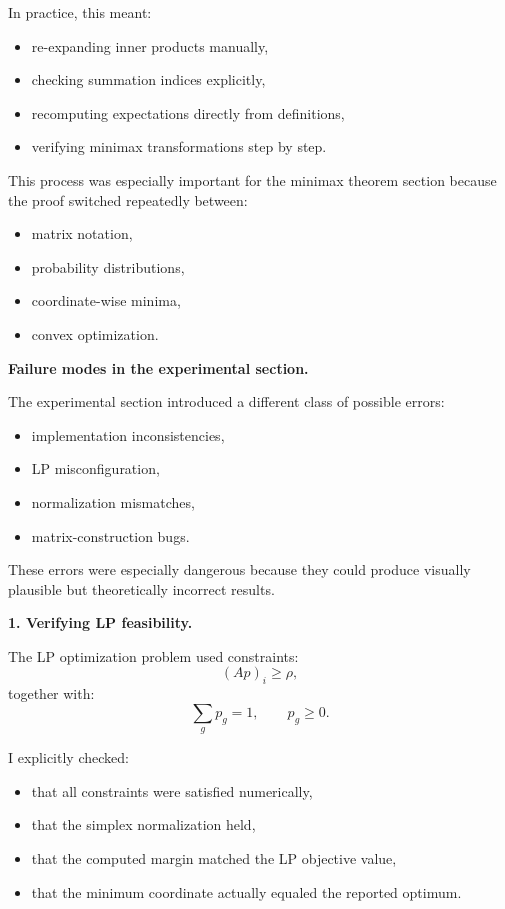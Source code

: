 \documentclass[11pt]{article}
\begin{document}
\begin{enumerate}
\begin{solutionbox}
In practice, this meant:
\begin{itemize}
    \item re-expanding inner products manually,
    \item checking summation indices explicitly,
    \item recomputing expectations directly from definitions,
    \item verifying minimax transformations step by step.
\end{itemize}

This process was especially important for the minimax theorem section because the proof switched repeatedly between:
\begin{itemize}
    \item matrix notation,
    \item probability distributions,
    \item coordinate-wise minima,
    \item convex optimization.
\end{itemize}

\bigskip

\textbf{Failure modes in the experimental section.}

The experimental section introduced a different class of possible errors:
\begin{itemize}
    \item implementation inconsistencies,
    \item LP misconfiguration,
    \item normalization mismatches,
    \item matrix-construction bugs.
\end{itemize}

These errors were especially dangerous because they could produce visually plausible but theoretically incorrect results.

\bigskip

\textbf{1. Verifying LP feasibility.}

The LP optimization problem used constraints:
\[
(Ap)_i\ge\rho,
\]
together with:
\[
\sum_gp_g=1,
\qquad
p_g\ge0.
\]

I explicitly checked:
\begin{itemize}
    \item that all constraints were satisfied numerically,
    \item that the simplex normalization held,
    \item that the computed margin matched the LP objective value,
    \item that the minimum coordinate actually equaled the reported optimum.
\end{itemize}


\end{solutionbox}
\end{enumerate}
\end{document}
